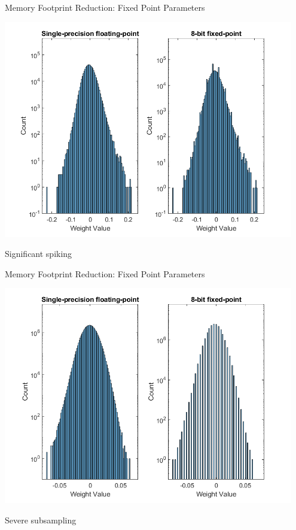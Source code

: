 \begin{frame}{Memory Footprint Reduction: Fixed Point Parameters}
	\begin{minipage}{0.6\textwidth}
		\centering
		\includegraphics[width=0.95\textwidth]{../Images/Weights-distributions/original-vs-fixed8/weight-distribution-conv5.png}\\
	\end{minipage}%
	\begin{minipage}{0.4\textwidth}
		\large Significant spiking\\
	\end{minipage}
\end{frame}

\begin{frame}{Memory Footprint Reduction: Fixed Point Parameters}
	\begin{minipage}{0.6\textwidth}
		\centering
		\includegraphics[width=0.95\textwidth]{../Images/Weights-distributions/original-vs-fixed8/weight-distribution-FC1.png}\\
	\end{minipage}%
	\begin{minipage}{0.4\textwidth}
		\large Severe subsampling\\
	\end{minipage}
\end{frame}

